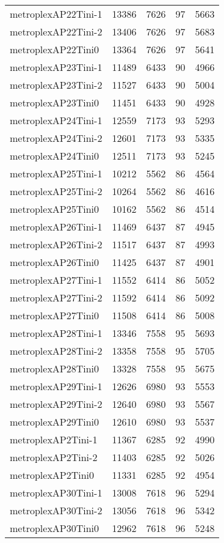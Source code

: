 \documentclass[../../../thesis.tex]{subfiles}
\begin{document}
\begin{longtable}{lrrrr}
metroplexAP22Tini-1 & 13386 & 7626 & 97 & 5663 \\
metroplexAP22Tini-2 & 13406 & 7626 & 97 & 5683 \\
metroplexAP22Tini0 & 13364 & 7626 & 97 & 5641 \\
metroplexAP23Tini-1 & 11489 & 6433 & 90 & 4966 \\
metroplexAP23Tini-2 & 11527 & 6433 & 90 & 5004 \\
metroplexAP23Tini0 & 11451 & 6433 & 90 & 4928 \\
metroplexAP24Tini-1 & 12559 & 7173 & 93 & 5293 \\
metroplexAP24Tini-2 & 12601 & 7173 & 93 & 5335 \\
metroplexAP24Tini0 & 12511 & 7173 & 93 & 5245 \\
metroplexAP25Tini-1 & 10212 & 5562 & 86 & 4564 \\
metroplexAP25Tini-2 & 10264 & 5562 & 86 & 4616 \\
metroplexAP25Tini0 & 10162 & 5562 & 86 & 4514 \\
metroplexAP26Tini-1 & 11469 & 6437 & 87 & 4945 \\
metroplexAP26Tini-2 & 11517 & 6437 & 87 & 4993 \\
metroplexAP26Tini0 & 11425 & 6437 & 87 & 4901 \\
metroplexAP27Tini-1 & 11552 & 6414 & 86 & 5052 \\
metroplexAP27Tini-2 & 11592 & 6414 & 86 & 5092 \\
metroplexAP27Tini0 & 11508 & 6414 & 86 & 5008 \\
metroplexAP28Tini-1 & 13346 & 7558 & 95 & 5693 \\
metroplexAP28Tini-2 & 13358 & 7558 & 95 & 5705 \\
metroplexAP28Tini0 & 13328 & 7558 & 95 & 5675 \\
metroplexAP29Tini-1 & 12626 & 6980 & 93 & 5553 \\
metroplexAP29Tini-2 & 12640 & 6980 & 93 & 5567 \\
metroplexAP29Tini0 & 12610 & 6980 & 93 & 5537 \\
metroplexAP2Tini-1 & 11367 & 6285 & 92 & 4990 \\
metroplexAP2Tini-2 & 11403 & 6285 & 92 & 5026 \\
metroplexAP2Tini0 & 11331 & 6285 & 92 & 4954 \\
metroplexAP30Tini-1 & 13008 & 7618 & 96 & 5294 \\
metroplexAP30Tini-2 & 13056 & 7618 & 96 & 5342 \\
metroplexAP30Tini0 & 12962 & 7618 & 96 & 5248 \\

\end{longtable}
\end{document}
